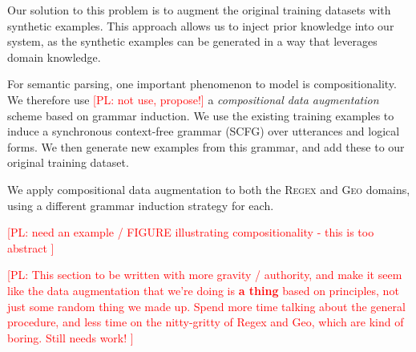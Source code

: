 \documentclass[11pt,letterpaper]{article}
\newcommand{\regex}{\textsc{Regex}\xspace}
\newcommand{\geo}{\textsc{Geo}\xspace}
\newcommand\pl[1]{\textcolor{red}{[PL: #1]}}
\begin{document}
Our solution to this problem is to
augment the original training datasets with synthetic examples.
This approach allows us to inject prior knowledge into our system,
as the synthetic examples can be generated 
in a way that leverages domain knowledge.

For semantic parsing, one important phenomenon to model is compositionality.
We therefore use \pl{not use, propose!} a \emph{compositional data augmentation} scheme
based on grammar induction.
We use the existing training examples to induce a
synchronous context-free grammar (SCFG) over utterances and logical forms.
We then generate new examples from this grammar,
and add these to our original training dataset.

We apply compositional data augmentation to both the \regex and \geo domains,
using a different grammar induction strategy for each.


\pl{need an example / FIGURE illustrating compositionality - this is too abstract
}

\pl{This section to be written with more gravity / authority,
  and make it seem like the data augmentation that we're doing is \textbf{a thing}
  based on principles, not just some random thing we made up.
  Spend more time talking about the general procedure,
  and less time on the nitty-gritty of Regex and Geo,
  which are kind of boring.
  Still needs work!
}
\end{document}
